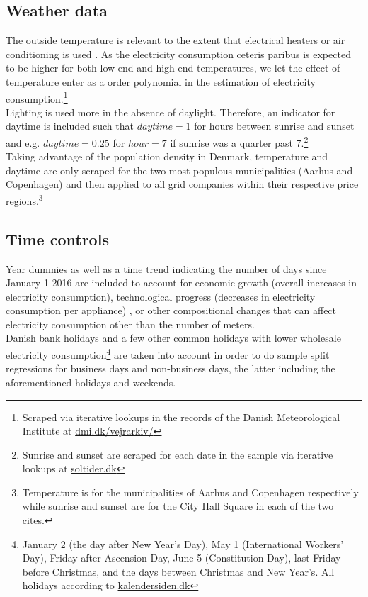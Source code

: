 \subsection{Weather data}
\label{subsec:d_weather}
The outside temperature is relevant to the extent that electrical heaters or air conditioning is used \citep{lijesen2007real, vesterberg2014residential}. As the electricity consumption ceteris paribus is expected to be higher for both low-end and high-end temperatures, we let the effect of temperature enter as a  order polynomial in the estimation of electricity consumption.\footnote{Scraped via iterative lookups in the records of the Danish Meteorological Institute at \href{https://www.dmi.dk/vejrarkiv/}{dmi.dk/vejrarkiv/}}
\medskip\\
Lighting is used more in the absence of daylight. Therefore, an indicator for daytime is included such that $daytime=1$ for hours between sunrise and sunset and e.g. $daytime=0.25$ for $hour=7$ if sunrise was a quarter past 7.\footnote{Sunrise and sunset are scraped for each date in the sample via iterative lookups at \href{https://soltider.dk/}{soltider.dk}}
\medskip\\
Taking advantage of the population density in Denmark, temperature and daytime are only scraped for the two most populous municipalities (Aarhus and Copenhagen) and then applied to all grid companies within their respective price regions.\footnote{Temperature is for the municipalities of Aarhus and Copenhagen respectively while sunrise and sunset are for the City Hall Square in each of the two cites.}

\subsection{Time controls}
\label{subsec:d_time}
Year dummies as well as a time trend indicating the number of days since January 1 2016 are included to account for economic growth (overall increases in electricity consumption), technological progress (decreases in electricity consumption per appliance) \citep{lijesen2007real}, or other compositional changes that can affect electricity consumption other than the number of meters.
\medskip\\
Danish bank holidays and a few other common holidays with lower wholesale electricity consumption\footnote{January 2 (the day after New Year's Day), May 1 (International Workers' Day), Friday after Ascension Day, June 5 (Constitution Day), last Friday before Christmas, and the days between Christmas and New Year's. All holidays according to \href{https://kalendersiden.dk/}{kalendersiden.dk}} are taken into account in order to do sample split regressions for business days and non-business days, the latter including the aforementioned holidays and weekends.
